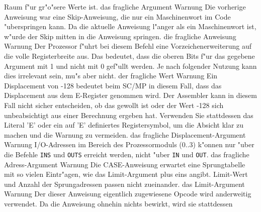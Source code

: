 \documentclass[12pt,a4paper,twoside]{report}
\begin{document}
\begin{description}
{                Raum f"ur gr"o"sere Werte ist.}
               {das fragliche Argument}
               {Warnung}
               {Die vorherige Anweisung war eine Skip-Anweisung, die
                nur ein Maschinenwort im Code "uberspringen kann. Da
                die aktuelle Anweisung l"anger als ein Maschinenwort
                ist, w"urde der Skip mitten in die Anweisung springen.}
               {die fragliche Anweisung}
               {Warnung}
               {Der Prozessor f"uhrt bei diesem Befehl eine Vorzeichenerweiterung
                auf die volle Registerbreite aus.  Das bedeutet, dass
                die oberen Bits f"ur das gegebene Argument mit 1 und
                nicht mit 0 gef"ullt werden.  Je nach folgender Nutzung
                kann dies irrelevant sein, mu"s aber nicht.}
               {der fragliche Wert}
               {Warnung}
               {Ein Displacement von -128 bedeutet beim SC/MP in diesem Fall, dass
                das Displacement aus dem E-Register genommen wird.  Der Assembler
                kann in diesem Fall nicht sicher entscheiden, ob das gewollt ist
                oder der Wert -128 sich unbeabsichtigt aus einer Berechnung ergeben
                hat.  Verwenden Sie stattdessen das Literal 'E' oder ein auf 'E'
                definiertes Registersymbol, um die Absicht klar zu machen und die
                Warnung zu vermeiden.}
               {das fragliche Displacement-Argument}
               {Warnung}
               {I/O-Adressen im Bereich des Prozessormoduls (0..3) k"onnen nur
                "uber die Befehle {\tt INS} und {\tt OUTS} erreicht werden,
                nicht "uber {\tt IN} und {\tt OUT}.}
               {das fragliche Adress-Argument}
               {Warnung}
               {Die CASE-Anweisung erwartet eine Sprungtabelle mit so vielen
                Eintr"agen, wie das Limit-Argument plus eins angibt.  Limit-Wert
                und Anzahl der Sprungadressen passen nicht zueinander.}
               {das Limit-Argument}
               {Warnung}
               {Der dieser Anweisung eigentlich zugewiesene Opcode wird anderweitig
                verwendet.  Da die Anweisung ohnehin nichts bewirkt, wird sie stattdessen
}
\end{description}
\end{document}
